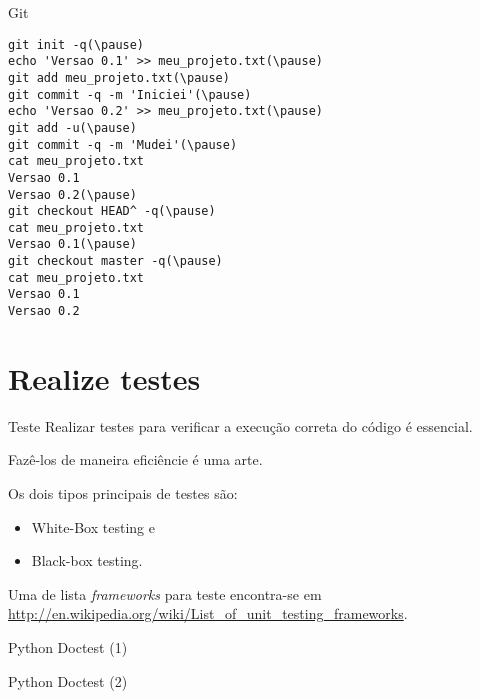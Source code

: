 \documentclass[11pt]{beamer}
\begin{document}
\begin{frame}[fragile]{Git}
    \begin{example}
        \begin{lstlisting}[escapeinside=()]
git init -q(\pause)
echo 'Versao 0.1' >> meu_projeto.txt(\pause)
git add meu_projeto.txt(\pause)
git commit -q -m 'Iniciei'(\pause)
echo 'Versao 0.2' >> meu_projeto.txt(\pause)
git add -u(\pause)
git commit -q -m 'Mudei'(\pause)
cat meu_projeto.txt
Versao 0.1
Versao 0.2(\pause)
git checkout HEAD^ -q(\pause)
cat meu_projeto.txt
Versao 0.1(\pause)
git checkout master -q(\pause)
cat meu_projeto.txt
Versao 0.1
Versao 0.2
        \end{lstlisting}
    \end{example}
\end{frame}

\section{Realize testes}
\begin{frame}{Teste}
    Realizar testes para verificar a execução correta do código é essencial.
    
    Fazê-los de maneira eficiêncie é uma arte.

    \pause
    Os dois tipos principais de testes são:
    \begin{itemize}
        \item White-Box testing e
        \item Black-box testing.
    \end{itemize}

    \pause
    Uma de lista \textit{frameworks} para teste encontra-se em
    \url{http://en.wikipedia.org/wiki/List_of_unit_testing_frameworks}.
\end{frame}

\begin{frame}[fragile]{Python Doctest (1)}
    \begin{example}
        
    \end{example}
\end{frame}

\begin{frame}[fragile]{Python Doctest (2)}
    \begin{example}[Continuação]
        
    \end{example}
\end{frame}
\end{document}
